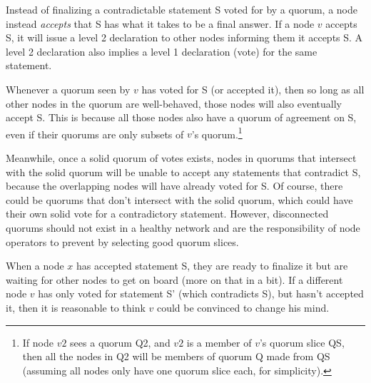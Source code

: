 Instead of finalizing a contradictable statement S voted for by a quorum, a node instead {\em accepts} that S has what it takes to be a final answer. If a node $v$ accepts S, it will issue a level 2 declaration to other nodes informing them it accepts S. A level 2 declaration also implies a level 1 declaration (vote) for the same statement.

Whenever a quorum seen by $v$ has voted for S (or accepted it), then so long as all other nodes in the quorum are well-behaved, those nodes will also eventually accept S. This is because all those nodes also have a quorum of agreement on S, even if their quorums are only subsets of $v$'s quorum.\footnote{If node $v2$ sees a quorum Q2, and $v2$ is a member of $v$'s quorum slice QS, then all the nodes in Q2 will be members of quorum Q made from QS (assuming all nodes only have one quorum slice each, for simplicity).}

Meanwhile, once a solid quorum of votes exists, nodes in quorums that intersect with the solid quorum will be unable to accept any statements that contradict S, because the overlapping nodes will have already voted for S. Of course, there could be quorums that don't intersect with the solid quorum, which could have their own solid vote for a contradictory statement. However, disconnected quorums should not exist in a healthy network and are the responsibility of node operators to prevent by selecting good quorum slices.

When a node $x$ has accepted statement S, they are ready to finalize it but are waiting for other nodes to get on board (more on that in a bit). If a different node $v$ has only voted for statement S' (which contradicts S), but hasn't accepted it, then it is reasonable to think $v$ could be convinced to change his mind.

